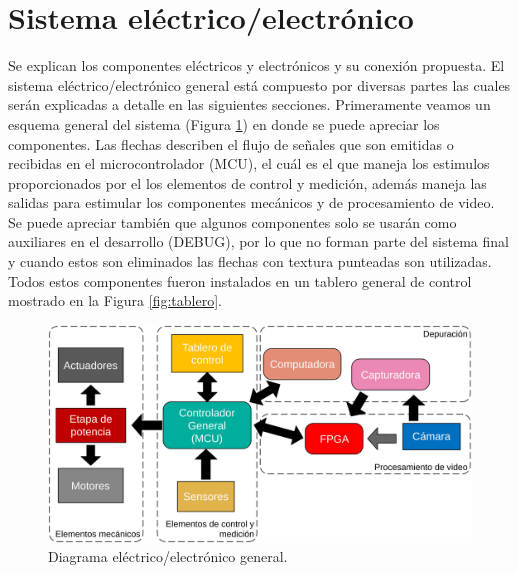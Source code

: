 \documentclass[twoside,spanish,ESP,MSc]{plantillaLabUPV}
\theoremstyle{definition}
\begin{document}
\section{Sistema eléctrico/electrónico}
Se explican los componentes eléctricos y electrónicos y su conexión propuesta. El sistema eléctrico/electrónico general está compuesto por diversas partes las cuales serán explicadas a detalle en las siguientes secciones. Primeramente veamos un esquema general del sistema (Figura \ref{fig:diagramagralelectrico}) en donde se puede apreciar los componentes. Las flechas describen el flujo de señales que son emitidas o recibidas en el microcontrolador (MCU), el cuál es el que maneja los estimulos proporcionados por el los elementos de control y medición, además maneja las salidas para estimular los componentes mecánicos y de procesamiento de video. Se puede apreciar también que algunos componentes solo se usarán como auxiliares en el desarrollo (DEBUG), por lo que no forman parte del sistema final y cuando estos son eliminados las flechas con textura punteadas son utilizadas. Todos estos componentes fueron instalados en un tablero general de control mostrado en la Figura \ref{fig:tablero}.

\begin{figure}[!tbh]
	\centering
	\includegraphics[width=\linewidth]{edrawimas/diagramagralelectrico}
	\caption{Diagrama eléctrico/electrónico general.}
	\label{fig:diagramagralelectrico}
\end{figure}
\end{document}
